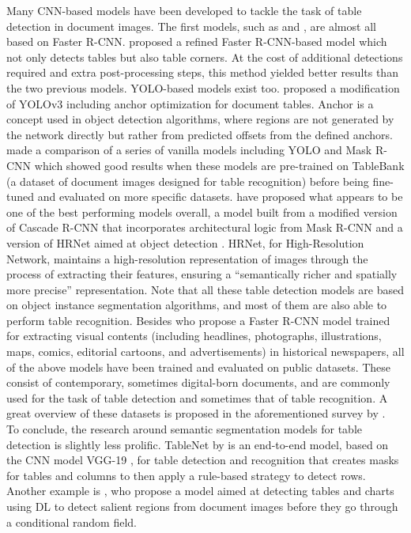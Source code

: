 Many CNN-based models have been developed to tackle the task of table detection in document images. The first models, such as \citet{gilani_table_2017} and \citet{schreiber_deepdesrt_2017}, are almost all based on Faster R-CNN. \citet{sun_faster_2019} proposed a refined Faster R-CNN-based model which not only detects tables but also table corners. At the cost of additional detections required and extra post-processing steps, this method yielded better results than the two previous models. YOLO-based models exist too. \citet{huang_yolo-based_2019} proposed a modification of YOLOv3 \citep{redmon_yolov3_2018} including anchor optimization for document tables. Anchor is a concept used in object detection algorithms, where regions are not generated by the network directly but rather from predicted offsets from the defined anchors. \citet{casado-garcia_benefits_2020} made a comparison of a series of vanilla models including YOLO and Mask R-CNN which showed good results when these models are pre-trained on TableBank \citep{li_tablebank_2020} (a dataset of document images designed for table recognition) before being fine-tuned and evaluated on more specific datasets. \citet{prasad_cascadetabnet_2020} have proposed what appears to be one of the best performing models overall, a model built from a modified version of Cascade R-CNN that incorporates architectural logic from Mask R-CNN and a version of HRNet aimed at object detection \citep{wang_deep_2020}. HRNet, for High-Resolution Network, maintains a high-resolution representation of images through the process of extracting their features, ensuring a ``semantically richer and spatially more precise'' representation. Note that all these table detection models are based on object instance segmentation algorithms, and most of them are also able to perform table recognition. Besides \cite{lee_newspaper_2020} who propose a Faster R-CNN model trained for extracting visual contents (including headlines, photographs, illustrations, maps, comics, editorial cartoons, and advertisements) in historical newspapers, all of the above models have been trained and evaluated on public datasets. These consist of contemporary, sometimes digital-born documents, and are commonly used for the task of table detection and sometimes that of table recognition. A great overview of these datasets is proposed in the aforementioned survey by \citet{hashmi_current_2021}. \\
To conclude, the research around semantic segmentation models for table detection is slightly less prolific. TableNet by \citet{paliwal_tablenet_2019} is an end-to-end model, based on the CNN model VGG-19 \citep{simonyan_very_2015}, for table detection and recognition that creates masks for tables and columns to then apply a rule-based strategy to detect rows. Another example is \citet{kavasidis_saliency-based_2018}, who propose a model aimed at detecting tables and charts using DL to detect salient regions from document images before they go through a conditional random field. 

